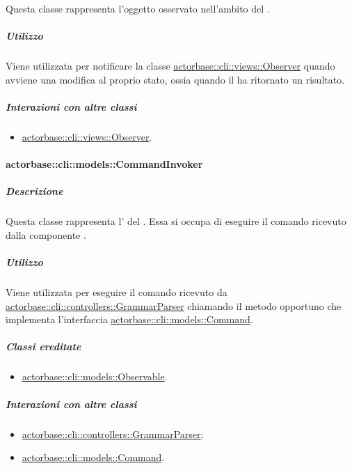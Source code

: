 \documentclass{scalatekids-article}
\begin{document}
Questa classe rappresenta l'oggetto osservato nell'ambito del  .

\subparagraph{Utilizzo}

Viene utilizzata per notificare la classe \hyperref[sec:actorbase::cli::views::Observer]{actorbase::cli::views::Observer}
quando avviene una modifica al proprio stato, ossia quando il 
ha ritornato un risultato.

\subparagraph{Interazioni con altre classi}

\begin{itemize}
\item \hyperref[sec:actorbase::cli::views::Observer]{actorbase::cli::views::Observer}.
\end{itemize}

\paragraph{actorbase::cli::models::CommandInvoker}
\label{sec:actorbase::cli::models::CommandInvoker}

\subparagraph{Descrizione}

Questa classe rappresenta l' del . Essa
si occupa di eseguire il comando ricevuto dalla componente .

\subparagraph{Utilizzo}

Viene utilizzata per eseguire il comando ricevuto da
\hyperref[sec:actorbase::cli::controllers::GrammarParser]{actorbase::cli::controllers::GrammarParser} chiamando il metodo opportuno che
implementa l'interfaccia \hyperref[sec:actorbase::cli::models::Command]{actorbase::cli::models::Command}.

\subparagraph{Classi ereditate}

\begin{itemize}
\item \hyperref[sec:actorbase::cli::models::Observable]{actorbase::cli::models::Observable}.
\end{itemize}

\subparagraph{Interazioni con altre classi}

\begin{itemize}
\item \hyperref[sec:actorbase::cli::controllers::GrammarParser]{actorbase::cli::controllers::GrammarParser};
\item \hyperref[sec:actorbase::cli::models::Command]{actorbase::cli::models::Command}.
\end{itemize}
\end{document}
